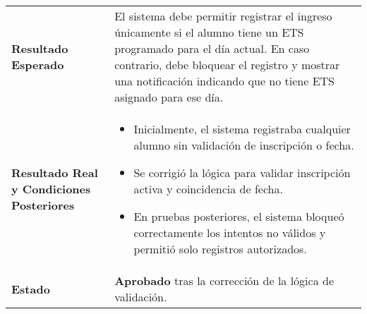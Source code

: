 \begin{longtable}{|p{5cm}|p{10cm}|}
\begin{itemize}
\begin{enumerate}
	\end{enumerate} \\
	\hline
	\textbf{Resultado Esperado} & 
	El sistema debe permitir registrar el ingreso únicamente si el alumno tiene un ETS programado para el día actual. En caso contrario, debe bloquear el registro y mostrar una notificación indicando que no tiene ETS asignado para ese día. \\
	\hline
	\textbf{Resultado Real y Condiciones Posteriores} & 
	\begin{itemize}
		\item Inicialmente, el sistema registraba cualquier alumno sin validación de inscripción o fecha.
		\item Se corrigió la lógica para validar inscripción activa y coincidencia de fecha.
		\item En pruebas posteriores, el sistema bloqueó correctamente los intentos no válidos y permitió solo registros autorizados.
	\end{itemize} \\
	\hline
	\textbf{Estado} & 
	\textbf{Aprobado} tras la corrección de la lógica de validación. \\
	\hline
\end{longtable}
